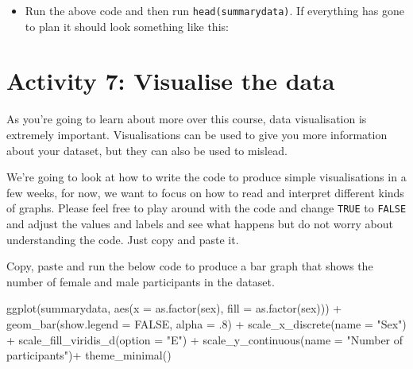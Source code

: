 \documentclass[
  oneside]{book}
\newenvironment{Shaded}{\begin{snugshade}}{\end{snugshade}}
\newcommand{\AttributeTok}[1]{\textcolor[rgb]{0.77,0.63,0.00}{#1}}
\newcommand{\ConstantTok}[1]{\textcolor[rgb]{0.00,0.00,0.00}{#1}}
\newcommand{\DecValTok}[1]{\textcolor[rgb]{0.00,0.00,0.81}{#1}}
\newcommand{\FunctionTok}[1]{\textcolor[rgb]{0.00,0.00,0.00}{#1}}
\newcommand{\NormalTok}[1]{#1}
\newcommand{\SpecialCharTok}[1]{\textcolor[rgb]{0.00,0.00,0.00}{#1}}
\newcommand{\StringTok}[1]{\textcolor[rgb]{0.31,0.60,0.02}{#1}}
\providecommand{\tightlist}{%
  \setlength{\itemsep}{0pt}\setlength{\parskip}{0pt}}
\begin{document}
\begin{itemize}
\tightlist
\item
  Run the above code and then run \texttt{head(summarydata)}. If everything has gone to plan it should look something like this:
\end{itemize}

\hypertarget{activity-7-visualise-the-data}{%
\section{Activity 7: Visualise the data}\label{activity-7-visualise-the-data}}

As you're going to learn about more over this course, data visualisation is extremely important. Visualisations can be used to give you more information about your dataset, but they can also be used to mislead.

We're going to look at how to write the code to produce simple visualisations in a few weeks, for now, we want to focus on how to read and interpret different kinds of graphs. Please feel free to play around with the code and change \texttt{TRUE} to \texttt{FALSE} and adjust the values and labels and see what happens but do not worry about understanding the code. Just copy and paste it.

Copy, paste and run the below code to produce a bar graph that shows the number of female and male participants in the dataset.

\begin{Shaded}
\begin{Highlighting}[]
\FunctionTok{ggplot}\NormalTok{(summarydata, }\FunctionTok{aes}\NormalTok{(}\AttributeTok{x =} \FunctionTok{as.factor}\NormalTok{(sex), }\AttributeTok{fill =} \FunctionTok{as.factor}\NormalTok{(sex))) }\SpecialCharTok{+}
  \FunctionTok{geom\_bar}\NormalTok{(}\AttributeTok{show.legend =} \ConstantTok{FALSE}\NormalTok{, }\AttributeTok{alpha =}\NormalTok{ .}\DecValTok{8}\NormalTok{) }\SpecialCharTok{+}
  \FunctionTok{scale\_x\_discrete}\NormalTok{(}\AttributeTok{name =} \StringTok{"Sex"}\NormalTok{) }\SpecialCharTok{+}
  \FunctionTok{scale\_fill\_viridis\_d}\NormalTok{(}\AttributeTok{option =} \StringTok{"E"}\NormalTok{) }\SpecialCharTok{+}
  \FunctionTok{scale\_y\_continuous}\NormalTok{(}\AttributeTok{name =} \StringTok{"Number of participants"}\NormalTok{)}\SpecialCharTok{+}
  \FunctionTok{theme\_minimal}\NormalTok{()}
\end{Highlighting}
\end{Shaded}
\end{document}
